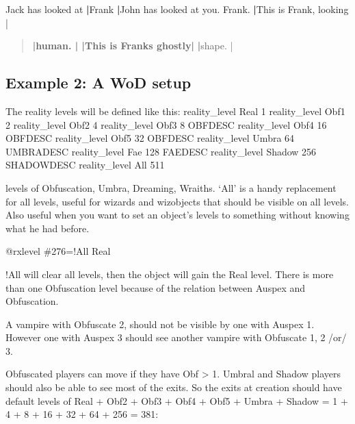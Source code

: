 \documentclass[letterpaper,10pt,english]{sphinxmanual}
\begin{document}
\sphinxAtStartPar
Jack has looked at      {\color{red}\bfseries{}|}Frank                  {\color{red}\bfseries{}|}John has looked at you.
Frank.                  {\color{red}\bfseries{}|}This is Frank, looking |
\begin{quote}

\sphinxAtStartPar
{\color{red}\bfseries{}|human.                 |
|This is Frank\textquotesingle{}s ghostly|}
{\color{red}\bfseries{}|}shape.                 |
\end{quote}


\subsection{Example 2: A WoD setup}
\label{\detokenize{advanced:example-2-a-wod-setup}}
\sphinxAtStartPar
The reality levels will be defined like this:
reality\_level           Real 1
reality\_level           Obf1 2
reality\_level           Obf2 4
reality\_level           Obf3 8 OBFDESC
reality\_level           Obf4 16 OBFDESC
reality\_level           Obf5 32 OBFDESC
reality\_level           Umbra 64 UMBRADESC
reality\_level           Fae 128 FAEDESC
reality\_level           Shadow 256 SHADOWDESC
reality\_level           All 511

 levels of Obfuscation, Umbra, Dreaming, Wraiths. ‘All’ is a handy
replacement for all levels, useful for wizards and wizobjects that should
be visible on all levels. Also useful when you want to set an object’s
levels to something without knowing what he had before.

\sphinxAtStartPar
@rxlevel \#276=!All Real

\sphinxAtStartPar
!All will clear all levels, then the object will gain the Real level.
There is more than one Obfuscation level because of the relation between
Auspex and Obfuscation.

\sphinxAtStartPar
A vampire with Obfuscate 2, should not be visible by one with Auspex 1.
However one with Auspex 3 should see another vampire with Obfuscate 1, 2
/or/ 3.

\sphinxAtStartPar
Obfuscated players can move if they have Obf \textgreater{} 1. Umbral and Shadow players
should also be able to see most of the exits. So the exits at creation
should have default levels of Real + Obf2 + Obf3 + Obf4 + Obf5 + Umbra +
Shadow = 1 + 4 + 8 + 16 + 32 + 64 + 256 = 381:

\begin{sphinxVerbatim}[commandchars=\\\{\}]
 
 
\end{sphinxVerbatim}
\end{document}

